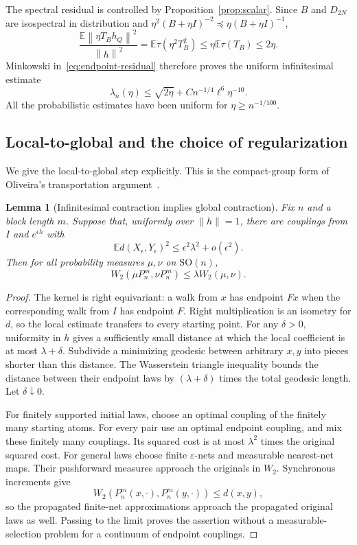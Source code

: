 \documentclass[11pt]{article}
\newtheorem{lemma}[theorem]{Lemma}
\theoremstyle{definition}\newtheorem{definition}[theorem]{Definition}
\theoremstyle{remark}\newtheorem{remark}[theorem]{Remark}
\newcommand{\E}{\mathbb E}
\newcommand{\SO}{\mathrm{SO}}
\newcommand{\norm}[1]{\left\lVert#1\right\rVert}
\begin{document}
The spectral residual is controlled by Proposition~\ref{prop:scalar}. Since $B$ and $D_{2N}$ are isospectral in distribution and
$\eta^2(B+\eta I)^{-2}\preceq\eta(B+\eta I)^{-1}$,
\begin{equation}\label{eq:residual-final}
 \frac{\E\norm{\eta T_Bh_Q}^2}{\norm h^2}
 =\E\tau(\eta^2T_B^2)\le\eta\E\tau(T_B)\le2\eta.
\end{equation}
Minkowski in~\eqref{eq:endpoint-residual} therefore proves the uniform infinitesimal estimate
\begin{equation}\label{eq:local-kappa}
 \lambda_n(\eta)\le\sqrt{2\eta}
       +C n^{-1/4}\ell^6\eta^{-10}.
\end{equation}
All the probabilistic estimates have been uniform for $\eta\ge n^{-1/100}$.

\subsection{Local-to-global and the choice of regularization}

We give the local-to-global step explicitly. This is the compact-group form of Oliveira's transportation argument~\cite{Oliveira}.
\begin{lemma}[Infinitesimal contraction implies global contraction]\label{lem:local-global-expanded}
Fix $n$ and a block length $m$. Suppose that, uniformly over $\|h\|=1$, there are couplings from $I$ and $e^{\epsilon h}$ with
\[
 \E d(X_\epsilon,Y_\epsilon)^2\le\epsilon^2\lambda^2+o(\epsilon^2).
\]
Then for all probability measures $\mu,\nu$ on $\SO(n)$,
\[
 W_2(\mu P_n^m,\nu P_n^m)\le\lambda W_2(\mu,\nu).
\]
\end{lemma}
\begin{proof}
The kernel is right equivariant: a walk from $x$ has endpoint $Fx$ when the corresponding walk from $I$ has endpoint $F$. Right multiplication is an isometry for $d$, so the local estimate transfers to every starting point. For any $\delta>0$, uniformity in $h$ gives a sufficiently small distance at which the local coefficient is at most $\lambda+\delta$. Subdivide a minimizing geodesic between arbitrary $x,y$ into pieces shorter than this distance. The Wasserstein triangle inequality bounds the distance between their endpoint laws by $(\lambda+\delta)$ times the total geodesic length. Let $\delta\downarrow0$.

For finitely supported initial laws, choose an optimal coupling of the finitely many starting atoms. For every pair use an optimal endpoint coupling, and mix these finitely many couplings. Its squared cost is at most $\lambda^2$ times the original squared cost. For general laws choose finite $\varepsilon$-nets and measurable nearest-net maps. Their pushforward measures approach the originals in $W_2$. Synchronous increments give
\[
 W_2(P_n^m(x,\cdot),P_n^m(y,\cdot))\le d(x,y),
\]
so the propagated finite-net approximations approach the propagated original laws as well. Passing to the limit proves the assertion without a measurable-selection problem for a continuum of endpoint couplings.
\end{proof}
\end{document}
